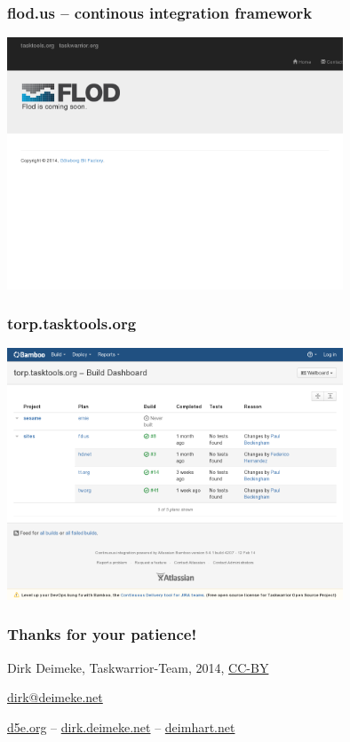 \documentclass[t,handout]{beamer}
\begin{document}
\begin{frame}\frametitle{flod.us -- continous integration framework}
\begin{center}
\href{http://flod.us/}{\includegraphics[width=10cm,height=7.5cm]{flod-us.png}}
\end{center}
\end{frame}

\begin{frame}\frametitle{torp.tasktools.org}
\begin{center}
\href{https://torp.tasktools.org}{\includegraphics[width=10cm,height=7.5cm]{torp-tasktools-org.png}}
\end{center}
\end{frame}

\begin{frame}\frametitle{Thanks for your patience!}
\begin{center}
Dirk Deimeke, Taskwarrior-Team, 2014, \href{https://creativecommons.org/licenses/by/4.0/}{CC-BY}

\href{mailto:dirk@deimeke.net}{dirk@deimeke.net}

\href{http://d5e.org/}{d5e.org} -- \href{http://dirk.deimeke.net/}{dirk.deimeke.net} -- \href{http://deimhart.net/}{deimhart.net}
\end{center}
\end{frame}
\end{document}
